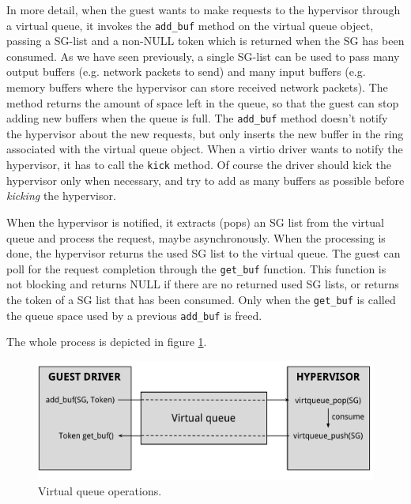 \vspace{0.5cm}

In more detail, when the guest wants to make requests to the hypervisor through a virtual queue, it invokes the \texttt{add\_buf} method
on the virtual queue object, passing a SG-list and a non-NULL token which is returned when the SG has been consumed. As we have seen 
previously, a single SG-list can be used to pass many output buffers (e.g. network packets to send) and many input buffers (e.g. memory 
buffers where the hypervisor can store received network packets). The method returns the amount of space left in the queue, so that 
the guest can stop adding new buffers when the queue is full.
The \texttt{add\_buf} method doesn't notify the hypervisor about the new requests, but only inserts the new buffer in the ring associated
with the virtual queue object. When a virtio driver wants to notify the hypervisor, it has to call the \texttt{kick} method. Of course
the driver should kick the hypervisor only when necessary, and try to add as many buffers as possible before \emph{kicking} the hypervisor.

When the hypervisor is notified, it extracts (pops) an SG list from the virtual queue and process the request, maybe asynchronously.
When the processing is done, the hypervisor returns the used SG list to the virtual queue.
The guest can poll for the request completion through the \texttt{get\_buf} function. This function is not blocking and returns NULL if 
there are no returned used SG lists, or returns the token of a SG list that has been consumed. Only when the \texttt{get\_buf} is called
the queue space used by a previous \texttt{add\_buf} is freed.

The whole process is depicted in figure \ref{fig:virtqueue}.

\begin{figure}[bt]
\centering
\includegraphics[scale = 0.48]{virtqueue.pdf}
\caption{Virtual queue operations.}
\label{fig:virtqueue}
\end{figure}

